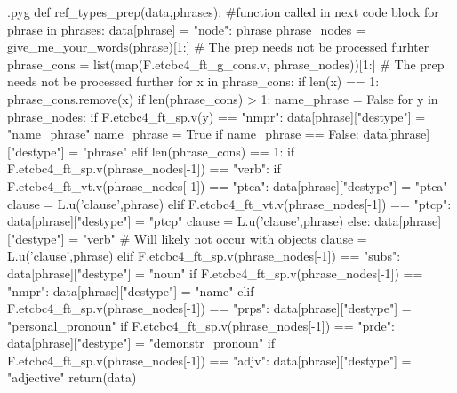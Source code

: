 \documentclass{report}
\makeatletter
\newenvironment{python}{%
  \VerbatimEnvironment
  \minted@resetoptions
  \setkeys{minted@opt}{}
      \begin{VerbatimOut}{\jobname.pyg}}
{%
      \end{VerbatimOut}
      \minted@pygmentize{python}
      \DeleteFile{\jobname.pyg}}
\makeatother
\begin{document}
\begin{python}
def ref_types_prep(data,phrases): #function called in next code block
    for phrase in phrases:
        data[phrase] = {"node": phrase}
        phrase_nodes = give_me_your_words(phrase)[1:] # The prep needs not be processed furhter
        phrase_cons = list(map(F.etcbc4_ft_g_cons.v, phrase_nodes))[1:] # The prep needs not be processed further
        for x in phrase_cons:
            if len(x) == 1:
                phrase_cons.remove(x)
        if len(phrase_cons) > 1:
            name_phrase = False
            for y in phrase_nodes:
                if F.etcbc4_ft_sp.v(y) == "nmpr":
                    data[phrase]["destype"] = "name_phrase"
                    name_phrase = True
            if name_phrase == False:
                data[phrase]["destype"] = "phrase"
        elif len(phrase_cons) == 1:
            if F.etcbc4_ft_sp.v(phrase_nodes[-1]) == "verb":
                if F.etcbc4_ft_vt.v(phrase_nodes[-1]) == "ptca":
                    data[phrase]["destype"] = "ptca"
                    clause = L.u('clause',phrase)
                elif F.etcbc4_ft_vt.v(phrase_nodes[-1]) == "ptcp":
                    data[phrase]["destype"] = "ptcp"
                    clause = L.u('clause',phrase)
                else:
                    data[phrase]["destype"] = "verb" # Will likely not occur with objects
                    clause = L.u('clause',phrase)
            elif F.etcbc4_ft_sp.v(phrase_nodes[-1]) == "subs":
                data[phrase]["destype"] = "noun"
            if F.etcbc4_ft_sp.v(phrase_nodes[-1]) == "nmpr":
                data[phrase]["destype"] = "name"
            elif F.etcbc4_ft_sp.v(phrase_nodes[-1]) == "prps":
                data[phrase]["destype"] = "personal_pronoun"
            if F.etcbc4_ft_sp.v(phrase_nodes[-1]) == "prde":
                data[phrase]["destype"] = "demonstr_pronoun"
            if F.etcbc4_ft_sp.v(phrase_nodes[-1]) == "adjv":
                data[phrase]["destype"] = "adjective"
    return(data)
                    

\end{python}
\end{document}
